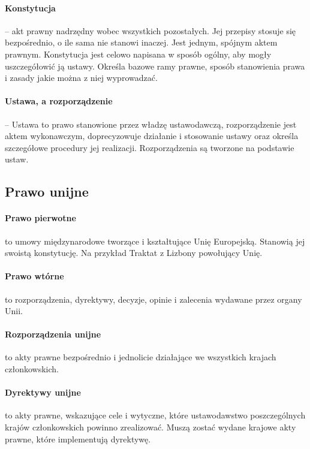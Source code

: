 \documentclass{article}
\begin{document}
\paragraph{Konstytucja}-- akt prawny nadrzędny wobec wszystkich pozostałych.
Jej przepisy stosuje się bezpośrednio, o ile sama nie stanowi inaczej.
Jest jednym, spójnym aktem prawnym. Konstytucja jest celowo napisana w sposób ogólny, aby mogły
uszczegółowić ją ustawy.
Określa bazowe ramy prawne, sposób stanowienia prawa i zasady jakie można z niej wyprowadzać.

\paragraph{Ustawa, a rozporządzenie} -- Ustawa to prawo stanowione przez władzę ustawodawczą,
rozporządzenie jest aktem wykonawczym, doprecyzowuje działanie i stosowanie ustawy oraz określa
szczegółowe procedury jej realizacji. Rozporządzenia są tworzone na podstawie ustaw.

\subsection{Prawo unijne}

\paragraph{Prawo pierwotne}
to umowy międzynarodowe tworzące i kształtujące Unię Europejską. Stanowią jej swoistą konstytucję.
Na przykład Traktat z Lizbony powołujący Unię.

\paragraph{Prawo wtórne}
to rozporządzenia, dyrektywy, decyzje, opinie i zalecenia wydawane przez organy Unii.

\paragraph{Rozporządzenia unijne} to akty prawne
bezpośrednio i jednolicie działające we wszystkich krajach członkowskich.

\paragraph{Dyrektywy unijne} to akty prawne,
wskazujące cele i wytyczne, które ustawodawstwo poszczególnych krajów członkowskich powinno zrealizować.
Muszą zostać wydane krajowe akty prawne, które implementują dyrektywę.
\end{document}
